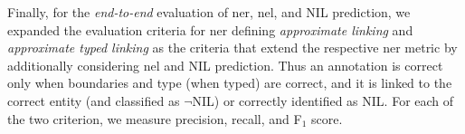 
Finally, for the \textit{end-to-end} evaluation of \ac{ner}, \ac{nel}, and NIL prediction, we expanded the evaluation criteria for \ac{ner} defining \textit{approximate linking} and \textit{approximate typed linking} as the criteria that extend the respective \ac{ner} metric by additionally considering \ac{nel} and NIL prediction. Thus an annotation is correct only when boundaries and type (when typed) are correct, and it is linked to the correct entity (and classified as $\neg$NIL) or correctly identified as NIL. For each of the two criterion, we measure precision, recall, and F$_1$ score. 



